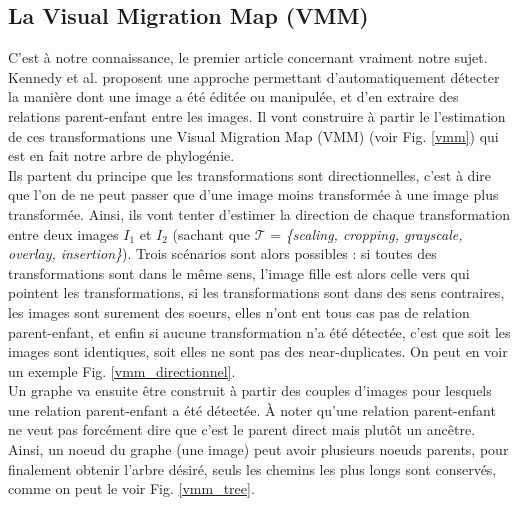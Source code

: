 \documentclass[utf8]{stageM2R} %
\begin{document}
\subsection{La Visual Migration Map (VMM)}
C'est à notre connaissance, le premier article concernant vraiment notre sujet. Kennedy et al. \cite{kennedy2008internet} proposent une approche permettant d'automatiquement détecter la manière dont une image a été éditée ou manipulée, et d'en extraire des relations parent-enfant entre les images. Il vont construire à partir le l'estimation de ces transformations une Visual Migration Map (VMM) (voir Fig. \ref{vmm}) qui est en fait notre arbre de phylogénie.
\\ \indent
Ils partent du principe que les transformations sont directionnelles, c'est à dire que l'on de ne peut passer que d'une image moins transformée à une image plus transformée. Ainsi, ils vont tenter d'estimer la direction de chaque transformation entre deux images $I_{1}$ et $I_{2}$ (sachant que $\mathcal{T}$ = \textit{\{scaling, cropping, grayscale, overlay, insertion\}}). Trois scénarios sont alors possibles : si toutes des transformations sont dans le même sens, l'image fille est alors celle vers qui pointent les transformations, si les transformations sont dans des sens contraires, les images sont surement des soeurs, elles n'ont ent tous cas pas de relation parent-enfant, et enfin si aucune transformation n'a été détectée, c'est que soit les images sont identiques, soit elles ne sont pas des near-duplicates. On peut en voir un exemple Fig. \ref{vmm_directionnel}.
\\ \indent
Un graphe va ensuite être construit à partir des couples d'images pour lesquels une relation parent-enfant a été détectée. À noter qu'une relation parent-enfant ne veut pas forcément dire que c'est le parent direct mais plutôt un ancêtre. Ainsi, un noeud du graphe (une image) peut avoir plusieurs noeuds parents, pour finalement obtenir l'arbre désiré, seuls les chemins les plus longs sont conservés, comme on peut le voir Fig. \ref{vmm_tree}.


\end{document}
